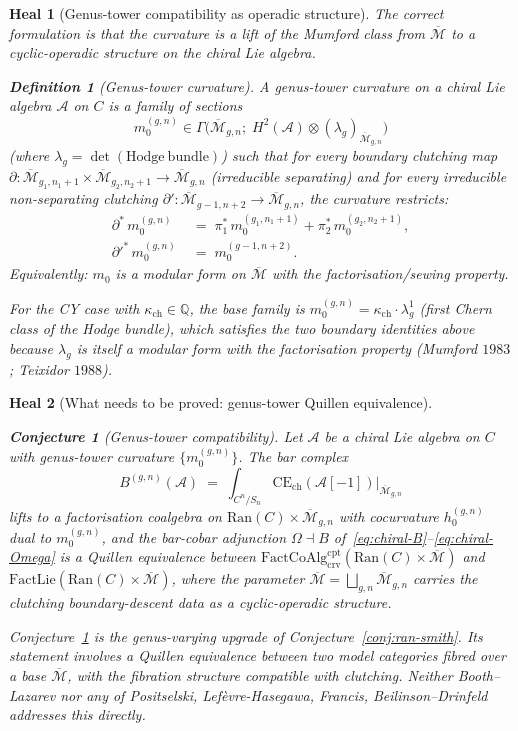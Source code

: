 \documentclass[11pt]{amsart}
\newtheorem*{heal}{Heal}
\newtheorem{conjecture}[theorem]{Conjecture}
\newtheorem{definition}[theorem]{Definition}
\newcommand{\kch}{\kappa_{\mathrm{ch}}}
\newcommand{\cA}{\mathcal{A}}
\newcommand{\cM}{\mathcal{M}}
\newcommand{\Ran}{\mathrm{Ran}}
\newcommand{\FactCoAlg}{\mathrm{FactCoAlg}}
\newcommand{\FactLie}{\mathrm{FactLie}}
\newcommand{\crv}{\mathrm{crv}}
\newcommand{\cpt}{\mathrm{cpt}}
\newcommand{\CE}{\mathrm{CE}}
\newcommand{\Mbar}{\overline{\cM}}
\begin{document}
\begin{heal}[Genus-tower compatibility as operadic structure]
The correct formulation is that the curvature is a lift of the Mumford
class from $\Mbar$ to a cyclic-operadic structure on the chiral Lie
algebra.

\begin{definition}[Genus-tower curvature]
\label{def:genus-tower-curvature}
A \emph{genus-tower curvature} on a chiral Lie algebra $\cA$ on $C$
is a family of sections
\[
m_0^{(g,n)} \in \Gamma\bigl(\Mbar_{g,n};\; H^2(\cA)\otimes
(\lambda_g)_{\Mbar_{g,n}}\bigr)
\]
(where $\lambda_g=\det(\mathrm{Hodge\ bundle})$) such that for every
boundary clutching map
$\partial:\Mbar_{g_1,n_1+1}\times\Mbar_{g_2,n_2+1}\to\Mbar_{g,n}$
(irreducible separating) and for every irreducible
non-separating clutching
$\partial':\Mbar_{g-1,n+2}\to\Mbar_{g,n}$, the curvature restricts:
\begin{align}
\partial^*\, m_0^{(g,n)} \;&=\;
 \pi_1^*\, m_0^{(g_1,n_1+1)} + \pi_2^*\, m_0^{(g_2,n_2+1)},
\\
\partial'^*\, m_0^{(g,n)} \;&=\;
 m_0^{(g-1,n+2)}.
\end{align}
Equivalently: $m_0$ is a modular form on $\Mbar$ with the
factorisation/sewing property.
\end{definition}

For the CY case with $\kch\in\mathbb{Q}$, the base family is
$m_0^{(g,n)}=\kch\cdot\lambda_g^{1}$ (first Chern class of the Hodge
bundle), which satisfies the two boundary identities above because
$\lambda_g$ is itself a modular form with the factorisation property
(Mumford $1983$; Teixidor $1988$).
\end{heal}

\begin{heal}[What needs to be proved: genus-tower Quillen equivalence]
\begin{conjecture}[Genus-tower compatibility]
\label{conj:genus-tower}
Let $\cA$ be a chiral Lie algebra on $C$ with genus-tower curvature
$\{m_0^{(g,n)}\}$. The bar complex
\[
B^{(g,n)}(\cA) \;=\; \int_{C^n/S_n}
\CE_{\mathrm{ch}}(\cA[-1])\bigg|_{\Mbar_{g,n}}
\]
lifts to a factorisation coalgebra on $\Ran(C)\times\Mbar_{g,n}$ with
cocurvature $h_0^{(g,n)}$ dual to $m_0^{(g,n)}$, and the bar-cobar
adjunction $\Omega\dashv B$ of~\eqref{eq:chiral-B}--\eqref{eq:chiral-Omega}
is a Quillen equivalence between
$\FactCoAlg^{\cpt}_{\crv}(\Ran(C)\times\Mbar)$ and
$\FactLie(\Ran(C)\times\Mbar)$, where the parameter
$\Mbar=\bigsqcup_{g,n}\Mbar_{g,n}$ carries the clutching
boundary-descent data as a cyclic-operadic structure.
\end{conjecture}
Conjecture~\ref{conj:genus-tower} is the \emph{genus-varying} upgrade
of Conjecture~\ref{conj:ran-smith}. Its statement involves a Quillen
equivalence between two model categories fibred over a base
$\Mbar$, with the fibration structure compatible with clutching.
Neither Booth--Lazarev nor any of Positselski, Lef\`evre-Hasegawa,
Francis, Beilinson--Drinfeld addresses this directly.
\end{heal}
\end{document}
